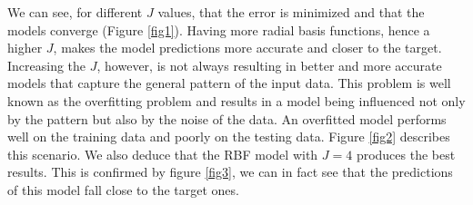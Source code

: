 \documentclass[runningheads]{llncs}
\begin{document}
We can see, for different $J$ values, that the error is
minimized and that the models converge (Figure \ref{fig1}). Having
more radial basis functions, hence a higher $J$, makes the model
predictions more accurate and closer to the target. Increasing the
$J$, however, is not always resulting in better and more accurate
models that capture the general pattern of the input data. This
problem is well known as the overfitting problem and results in a
model being influenced not only by the pattern but also by the noise
of the data. An overfitted model performs well on the training data
and poorly on the testing data. Figure \ref{fig2} describes this
scenario. We also deduce that the RBF model with $J = 4$
produces the best results. This is confirmed by figure \ref{fig3}, we
can in fact see that the predictions of this model fall close to the
target ones.
\end{document}
